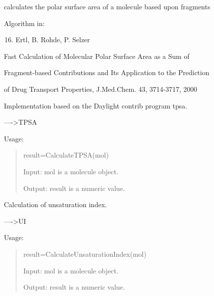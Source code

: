 \documentclass[letterpaper,10pt,english]{sphinxmanual}
\begin{document}

\begin{fulllineitems}
\label{reference/molproperty:molproperty.CalculateTPSA}
calculates the polar surface area of a molecule based upon fragments

Algorithm in:
\begin{enumerate}
\setcounter{enumi}{15}
\item {} 
Ertl, B. Rohde, P. Selzer

\end{enumerate}

Fast Calculation of Molecular Polar Surface Area as a Sum of

Fragment-based Contributions and Its Application to the Prediction

of Drug Transport Properties, J.Med.Chem. 43, 3714-3717, 2000

Implementation based on the Daylight contrib program tpsa.

----\textgreater{}TPSA

Usage:
\begin{quote}

result=CalculateTPSA(mol)

Input: mol is a molecule object.

Output: result is a numeric value.
\end{quote}

\end{fulllineitems}


\begin{fulllineitems}
\label{reference/molproperty:molproperty.CalculateUnsaturationIndex}
Calculation of unsaturation index.

----\textgreater{}UI

Usage:
\begin{quote}

result=CalculateUnsaturationIndex(mol)

Input: mol is a molecule object.

Output: result is a numeric value.
\end{quote}

\end{fulllineitems}
\end{document}
